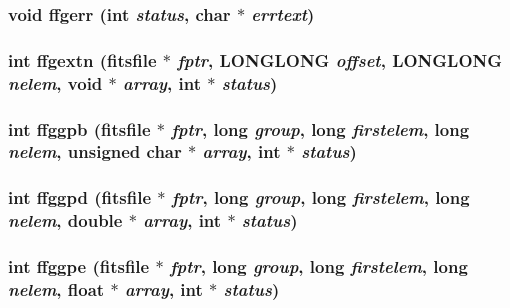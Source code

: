 \subsubsection{\setlength{\rightskip}{0pt plus 5cm}void ffgerr (int {\em status}, char $\ast$ {\em errtext})}\label{fitsio_8h_68877812456ad601bf6d5e8f8d9123c2}


\subsubsection{\setlength{\rightskip}{0pt plus 5cm}int ffgextn (\bf{fitsfile} $\ast$ {\em fptr}, \bf{LONGLONG} {\em offset}, \bf{LONGLONG} {\em nelem}, void $\ast$ {\em array}, int $\ast$ {\em status})}\label{fitsio_8h_5fc4e41295a193c81ec7cccd1d682ef2}


\subsubsection{\setlength{\rightskip}{0pt plus 5cm}int ffggpb (\bf{fitsfile} $\ast$ {\em fptr}, long {\em group}, long {\em firstelem}, long {\em nelem}, unsigned char $\ast$ {\em array}, int $\ast$ {\em status})}\label{fitsio_8h_4f44dabf1398b1faa74931df1070d4ef}


\subsubsection{\setlength{\rightskip}{0pt plus 5cm}int ffggpd (\bf{fitsfile} $\ast$ {\em fptr}, long {\em group}, long {\em firstelem}, long {\em nelem}, double $\ast$ {\em array}, int $\ast$ {\em status})}\label{fitsio_8h_e50059a5fe73bbfe285c204a0fcbb81b}


\subsubsection{\setlength{\rightskip}{0pt plus 5cm}int ffggpe (\bf{fitsfile} $\ast$ {\em fptr}, long {\em group}, long {\em firstelem}, long {\em nelem}, float $\ast$ {\em array}, int $\ast$ {\em status})}\label{fitsio_8h_5d09492332cbecfe94b123b8a0defeb9}


